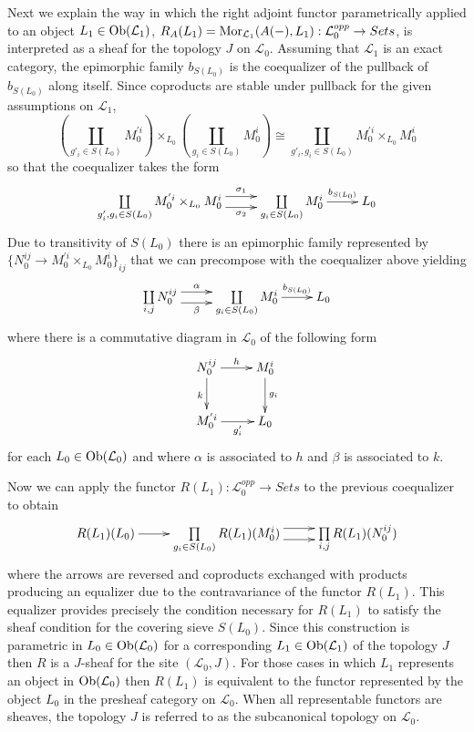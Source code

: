 \documentclass[aps,twocolumn]{revtex4-1}
\begin{document}
Next we explain the way in which the right adjoint functor parametrically applied to an object $L_1 \in \mathop{\rm Ob}\nolimits(\mathcal{L}_1)$, $R_A(L_1) = \mathop{\rm Mor}\nolimits_{\mathcal{L}_1}(A(-),L_1): \mathcal{L}_0^{opp} \rightarrow Sets$, is interpreted as a sheaf for the topology $J$ on $\mathcal{L}_0$. Assuming that $\mathcal{L}_1$ is an exact category, the epimorphic family $b_{S(L_0)}$ is the coequalizer of the pullback of $b_{S(L_0)}$ along itself. Since coproducts are stable under pullback for the given assumptions on $\mathcal{L}_1$, 
$$
\left( \coprod\limits_{g'_i \in S(L_0)} M_{0}^{'i} \right) \times_{L_0} \left( \coprod\limits_{g_i \in S(L_0)} M_0^i \right) \cong \coprod\limits_{g'_i , g_i \in S(L_0)} M_0^{'i} \times_{L_0} M_0^i
$$
so that the coequalizer takes the form
\begin{displaymath}
\xymatrix{
\coprod\limits_{g'_i , g_i \in S(L_0)} M_0^{'i} \times_{L_0} M_0^i
\ar@<1ex>[r]^-{\sigma_1} \ar@<-1ex>[r]_-{\sigma_2}
&
\coprod\limits_{g_i \in S(L_0)} M_0^i
\ar[r]^-{b_{S(L_0)}}
&
L_0
}
\end{displaymath}
Due to transitivity of $S(L_0)$ there is an epimorphic family represented by $\{ N_0^{ij} \rightarrow M_0^{'i} \times_{L_0} M_0^i \}_{ij}$ that we can precompose with the coequalizer above yielding
\begin{displaymath}
\xymatrix{
\coprod\limits_{i,j} N_0^{ij}
\ar@<1ex>[r]^-{\alpha} \ar@<-1ex>[r]_-{\beta}
&
\coprod\limits_{g_i \in S(L_0)} M_0^i
\ar[r]^-{b_{S(L_0)}}
&
L_0
}
\end{displaymath}
where there is a commutative diagram in $\mathcal{L}_0$ of the following form
\begin{displaymath}
\xymatrix{
N_0^{ij} \ar[r]^-{h} \ar[d]_{k} & M_0^i \ar[d]^{g_i} \\
M_0^{'i} \ar[r]_-{g'_i} & L_0
}
\end{displaymath}
for each $L_0 \in \mathop{\rm Ob}\nolimits(\mathcal{L}_0)$ and where $\alpha$ is associated to $h$ and $\beta$ is associated to $k$.

Now we can apply the functor $R(L_1): \mathcal{L}_0^{opp} \rightarrow Sets$ to the previous coequalizer to obtain
\begin{displaymath}
\xymatrix{
R(L_1)(L_0) \ar[r]
&
\prod\limits_{g_i \in S(L_0)} R(L_1)(M_0^i)
\ar@<1ex>[r]^-{} \ar@<-1ex>[r]_-{}
&
\prod\limits_{i,j} R(L_1)(N_0^{ij})
}
\end{displaymath}
where the arrows are reversed and coproducts exchanged with products producing an equalizer due to the contravariance of the functor $R(L_1)$. This equalizer provides precisely the condition necessary for $R(L_1)$ to satisfy the sheaf condition for the covering sieve $S(L_0)$. Since this construction is parametric in $L_0 \in \mathop{\rm Ob}\nolimits(\mathcal{L}_0)$ for a corresponding $L_1 \in \mathop{\rm Ob}\nolimits(\mathcal{L}_1)$ of the topology $J$ then $R$ is a $J$-sheaf for the site $(\mathcal{L}_0,J)$. For those cases in which $L_1$ represents an object in $\mathop{\rm Ob}\nolimits(\mathcal{L}_0)$ then $R(L_1)$ is equivalent to the functor represented by the object $L_0$ in the presheaf category on $\mathcal{L}_0$. When all representable functors are sheaves, the topology $J$ is referred to as the subcanonical topology on $\mathcal{L}_0$.
\end{document}
